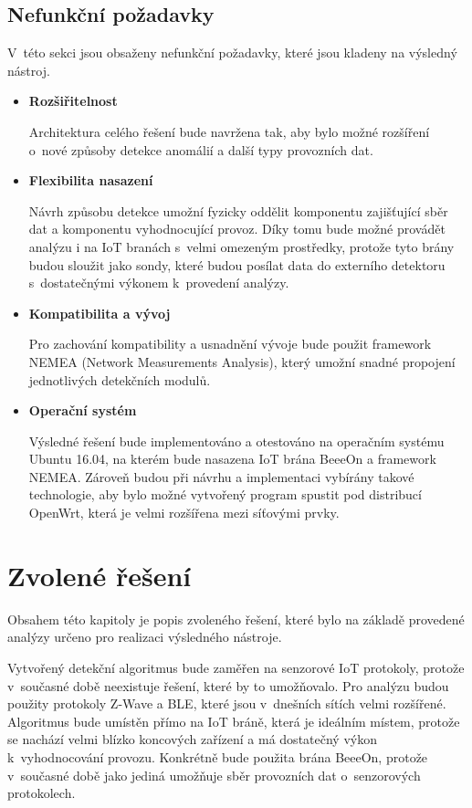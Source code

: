   \subsection{Nefunkční požadavky}
  V~této sekci jsou obsaženy nefunkční požadavky, které jsou kladeny na výsledný nástroj.
  \begin{itemize}
   \item \textbf{Rozšiřitelnost}
   
   Architektura celého řešení bude navržena tak, aby bylo možné rozšíření o~nové 
   způsoby detekce anomálií a další typy provozních dat.
   
   \item \textbf{Flexibilita nasazení}
   
   Návrh způsobu detekce umožní fyzicky oddělit komponentu zajišťující sběr dat a komponentu vyhodnocující 
   provoz. Díky tomu bude možné provádět analýzu i na IoT branách s~velmi omezeným prostředky, protože 
   tyto brány budou sloužit jako sondy, které budou posílat data do externího detektoru s~dostatečnými 
   výkonem k~provedení analýzy. 
   
   \item \textbf{Kompatibilita a vývoj}
   
   Pro zachování kompatibility a usnadnění vývoje bude použit framework NEMEA
    \cite{nemea} (Network Measurements Analysis), který umožní snadné propojení 
    jednotlivých detekčních modulů.
   
   \item \textbf{Operační systém}
   
   Výsledné řešení bude implementováno a otestováno na operačním systému Ubuntu 16.04, na kterém 
   bude nasazena IoT brána BeeeOn a framework NEMEA. Zároveň
   budou při návrhu a implementaci vybírány takové technologie, aby bylo možné vytvořený program
   spustit pod distribucí OpenWrt, která je velmi rozšířena mezi síťovými prvky.   
   
  \end{itemize}

 \newpage 
 \section{Zvolené řešení}
 Obsahem této kapitoly je popis zvoleného řešení, které bylo na základě provedené analýzy
 určeno pro realizaci výsledného nástroje.
 
 Vytvořený detekční algoritmus bude zaměřen na senzorové IoT protokoly, protože v~současné době 
 neexistuje řešení, které by to umožňovalo. Pro analýzu budou použity protokoly Z-Wave a BLE, 
 které jsou v~dnešních sítích velmi rozšířené. Algoritmus bude umístěn přímo na IoT bráně, která 
 je ideálním místem, protože
 se nachází velmi blízko koncových zařízení a má dostatečný výkon k~vyhodnocování provozu. 
 Konkrétně bude použita brána BeeeOn, protože v~současné době 
 jako jediná umožňuje sběr provozních dat o~senzorových protokolech. 
 
